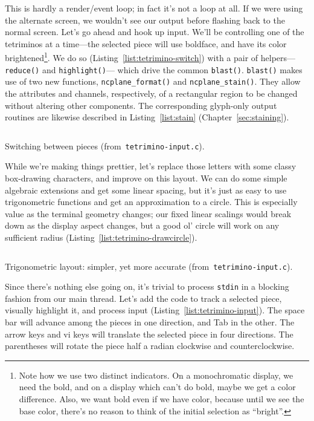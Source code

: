 This is hardly a render/event loop; in fact it's not a loop at all. If we were
using the alternate screen, we wouldn't see our output before flashing back to
the normal screen. Let's go ahead and hook up input. We'll be controlling one
of the tetriminos at a time---the selected piece will use boldface, and have its
color brightened\footnote{Note how we use two distinct indicators. On a monochromatic
display, we need the bold, and on a display which can't do bold, maybe we get a
color difference. Also, we want bold even if we have color, because until we
see the base color, there's no reason to think of the initial selection as
``bright''.}. We do so (Listing~\ref{list:tetrimino-switch}) with a pair of
helpers---\texttt{reduce()} and \texttt{highlight()}--- which drive the common
\texttt{blast()}. \texttt{blast()} makes use of two new functions,
\texttt{ncplane\_format()} and \texttt{ncplane\_stain()}. They allow the
attributes and channels, respectively, of a rectangular region to be changed
without altering other components. The corresponding glyph-only output routines
are likewise described in Listing~\ref{list:stain}
(Chapter~\ref{sec:staining}).

\begin{listing}[!htbp]
\inputminted[]{C}{code/tetrimino-switch.h}
\caption{Switching between pieces (from~\texttt{tetrimino-input.c}).}
\label{list:tetrimino-switch}
\end{listing}

While we're making things prettier, let's replace
those letters with some classy box-drawing characters, and improve on this
layout. We can do some simple algebraic extensions and get some linear spacing,
but it's just as easy to use trigonometric functions and get an approximation
to a circle. This is especially value as the terminal geometry changes; our
fixed linear scalings would break down as the display aspect changes, but a
good ol' circle will work on any sufficient radius
(Listing~\ref{list:tetrimino-drawcircle}).

\begin{listing}[!htbp]
\inputminted[]{C}{code/tetrimino-drawcircle.h}
\caption{Trigonometric layout: simpler, yet more accurate (from~\texttt{tetrimino-input.c}).}
\label{list:tetrimino-drawcircle}
\end{listing}

Since there's nothing else going on, it's trivial to process \texttt{stdin} in
a blocking fashion from our main thread. Let's add the code to track a selected
piece, visually highlight it, and process input (Listing~\ref{list:tetrimino-input}).
The space bar will advance among the pieces in one direction,
and Tab in the other. The arrow keys and vi keys will translate the selected
piece in four directions. The parentheses will rotate the piece half a radian
clockwise and counterclockwise.

